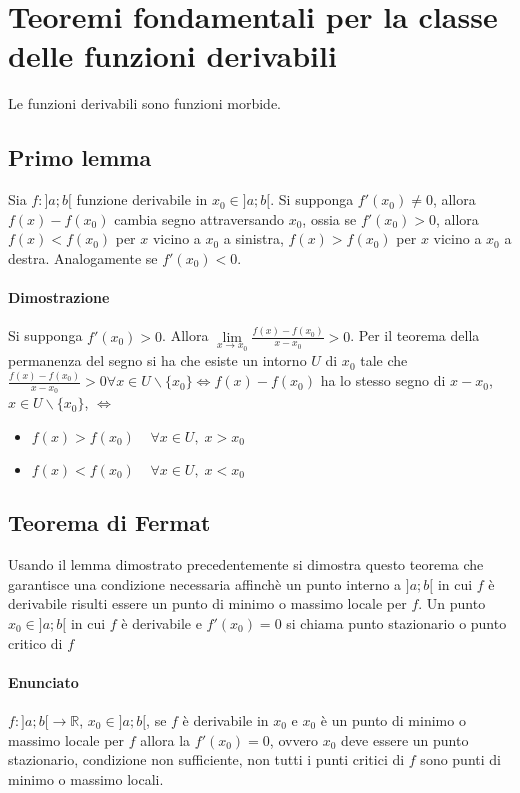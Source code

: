 \chapter{Teoremi fondamentali per la classe delle funzioni derivabili}
Le funzioni derivabili sono funzioni morbide.
\section{Primo lemma}
Sia $f:]a;b[$ funzione derivabile in $x_0\in]a;b[$. Si supponga $f'(x_0)\neq 0$, allora $f(x)-f(x_0)$ cambia segno attraversando $x_0$, ossia se $f'(x_0)>0$, allora 
$f(x)<f(x_0)$ per $x$ vicino a $x_0$ a sinistra, $f(x)>f(x_0)$ per $x$ vicino a $x_0$ a destra. Analogamente se $f'(x_0)<0$.
\subsubsection{Dimostrazione}
Si supponga $f'(x_0)>0$. Allora $\lim\limits_{x\rightarrow x_0}\frac{f(x)-f(x_0)}{x-x_0}>0$. Per il teorema della permanenza del segno si ha che esiste un intorno $U$ di 
$x_0$ tale che $\frac{f(x)-f(x_0)}{x-x_0}>0\forall x\in U\backslash\{x_0\}\Leftrightarrow f(x)-f(x_0)$ ha lo stesso segno di $x-x_0$, $x\in U\backslash\{x_0\}$, 
$\Leftrightarrow$
\begin{itemize}
\item $f(x)>f(x_0)\;\;\;\;\forall x\in U,\;x>x_0$
\item $f(x)<f(x_0)\;\;\;\;\forall x\in U,\;x<x_0$
\end{itemize}
\section{Teorema di Fermat}
Usando il lemma dimostrato precedentemente si dimostra questo teorema che garantisce una condizione necessaria affinch\`e un punto interno a $]a;b[$ in cui $f$ \`e derivabile
risulti essere un punto di minimo o massimo locale per $f$. Un punto $x_0\in ]a;b[$ in cui $f$ \`e derivabile e $f'(x_0)=0$ si chiama punto stazionario o punto critico di $f$
\subsubsection{Enunciato}
$f:]a;b[\rightarrow\mathbb{R}$, $x_0\in]a;b[$, se $f$ \`e derivabile in $x_0$ e $x_0$ \`e un punto di minimo o massimo locale per $f$ allora la $f'(x_0)=0$, ovvero $x_0$ deve essere un punto stazionario, condizione non sufficiente, non tutti i punti critici di $f$ sono punti di minimo o massimo locali.
